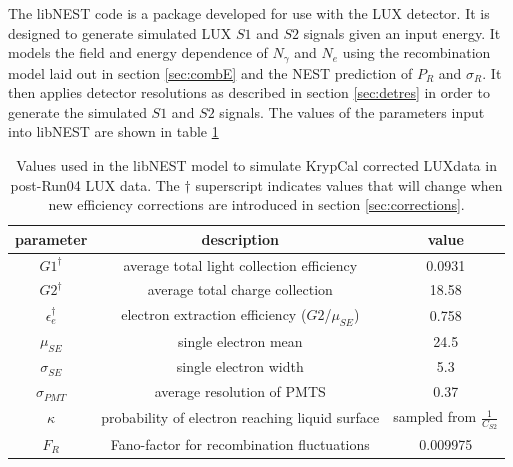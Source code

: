 The libNEST code is a package developed for use with the LUX detector. It is designed to generate simulated LUX $S1$ and $S2$ signals given an input energy. It models the field and energy dependence of $N_{\gamma}$ and $N_e$ using the recombination model laid out in section \ref{sec:combE} and the NEST prediction of $P_R$ and $\sigma_R$. It then applies detector resolutions as described in section \ref{sec:detres} in order to generate the simulated $S1$ and $S2$ signals. The values of the parameters input into libNEST are shown in table \ref{tab:libnestparms}
\begin{table}[h!]
\centering
    \begin{tabular}{ c | c | c  }
    \hline
    parameter & description & value \\
    \hline \hline
    $G1^{\dagger}$ & average total light collection efficiency & 0.0931\\
    \hline
    $G2^{\dagger}$ & average total charge collection & 18.58\\
    \hline
    $\epsilon_e^{\dagger}$ & electron extraction efficiency ($G2$/$\mu_{SE}$) & 0.758\\
    \hline
    $\mu_{SE}$ & single electron mean & 24.5\\
    \hline
    $\sigma_{SE}$ & single electron width & 5.3\\
    \hline
    $\sigma_{PMT}$ & average resolution of PMTS & 0.37\\
    \hline
    $\kappa$ & probability of electron reaching liquid surface & sampled from $\frac{1}{C_{S2}}$\\
    \hline
    $F_R$ & Fano-factor for recombination fluctuations & 0.009975\\
    \hline
    \end{tabular}
    \caption{Values used in the libNEST model to simulate KrypCal corrected LUXdata in post-Run04 LUX data. The $\dagger$ superscript indicates values that will change when new efficiency corrections are introduced in section \ref{sec:corrections}.}
    \label{tab:libnestparms}
\end{table}



